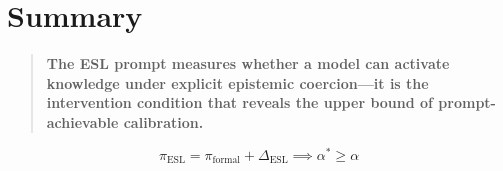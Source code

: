 \documentclass[11pt,a4paper]{article}
\begin{document}
\section{Summary}

\begin{quote}
\textbf{The ESL prompt measures whether a model can activate knowledge under explicit epistemic coercion---it is the intervention condition that reveals the upper bound of prompt-achievable calibration.}
\end{quote}

\begin{equation}
\boxed{\pi_{\text{ESL}} = \pi_{\text{formal}} + \Delta_{\text{ESL}} \implies \alpha^* \geq \alpha}
\end{equation}
\end{document}
